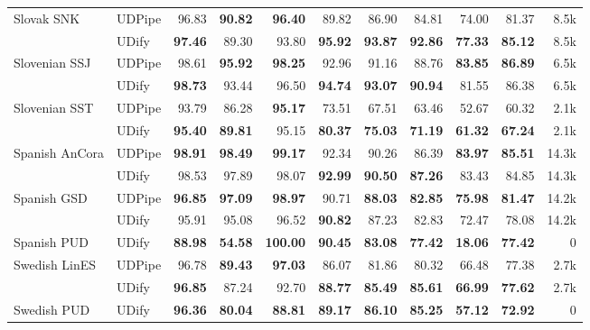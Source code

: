\documentclass[11pt,a4paper]{article}
\begin{document}
\begin{table*}
\begin{center}
\begin{tabular}{@{}llrrrrrrrrr@{}}
    \addlinespace
    Slovak SNK & UDPipe &      96.83 &  \bf 90.82 &   \bf 96.40 &      89.82 &      86.90 &      84.81 &      74.00 &      81.37 &   8.5k \\
               & UDify &  \bf 97.46 &      89.30 &       93.80 &  \bf 95.92 &  \bf 93.87 &  \bf 92.86 &  \bf 77.33 &  \bf 85.12 &   8.5k \\
    \addlinespace
    Slovenian SSJ & UDPipe &      98.61 &  \bf 95.92 &   \bf 98.25 &      92.96 &      91.16 &      88.76 &  \bf 83.85 &  \bf 86.89 &   6.5k \\
               & UDify &  \bf 98.73 &      93.44 &       96.50 &  \bf 94.74 &  \bf 93.07 &  \bf 90.94 &      81.55 &      86.38 &   6.5k \\
    \addlinespace
    Slovenian SST & UDPipe &      93.79 &      86.28 &   \bf 95.17 &      73.51 &      67.51 &      63.46 &      52.67 &      60.32 &   2.1k \\
               & UDify &  \bf 95.40 &  \bf 89.81 &       95.15 &  \bf 80.37 &  \bf 75.03 &  \bf 71.19 &  \bf 61.32 &  \bf 67.24 &   2.1k \\
    \addlinespace
    Spanish AnCora & UDPipe &  \bf 98.91 &  \bf 98.49 &   \bf 99.17 &      92.34 &      90.26 &      86.39 &  \bf 83.97 &  \bf 85.51 &  14.3k \\
               & UDify &      98.53 &      97.89 &       98.07 &  \bf 92.99 &  \bf 90.50 &  \bf 87.26 &      83.43 &      84.85 &  14.3k \\
    \addlinespace
    Spanish GSD & UDPipe &  \bf 96.85 &  \bf 97.09 &   \bf 98.97 &      90.71 &  \bf 88.03 &  \bf 82.85 &  \bf 75.98 &  \bf 81.47 &  14.2k \\
               & UDify &      95.91 &      95.08 &       96.52 &  \bf 90.82 &      87.23 &      82.83 &      72.47 &      78.08 &  14.2k \\
    \addlinespace
    Spanish PUD & UDify &  \bf 88.98 &  \bf 54.58 &  \bf 100.00 &  \bf 90.45 &  \bf 83.08 &  \bf 77.42 &  \bf 18.06 &  \bf 77.42 &      0 \\
    \addlinespace
    Swedish LinES & UDPipe &      96.78 &  \bf 89.43 &   \bf 97.03 &      86.07 &      81.86 &      80.32 &      66.48 &      77.38 &   2.7k \\
               & UDify &  \bf 96.85 &      87.24 &       92.70 &  \bf 88.77 &  \bf 85.49 &  \bf 85.61 &  \bf 66.99 &  \bf 77.62 &   2.7k \\
    \addlinespace
    Swedish PUD & UDify &  \bf 96.36 &  \bf 80.04 &   \bf 88.81 &  \bf 89.17 &  \bf 86.10 &  \bf 85.25 &  \bf 57.12 &  \bf 72.92 &      0 \\

\end{tabular}
\end{center}
\end{table*}
\end{document}

